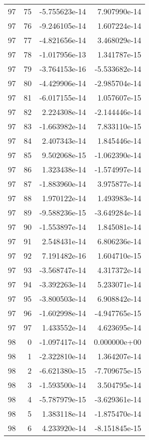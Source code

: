 \begin{tabular}{rrrr}
  97 &   75 & -5.755623e-14 &  7.907990e-14 \\
  97 &   76 & -9.246105e-14 &  1.607224e-14 \\
  97 &   77 & -4.821656e-14 &  3.468029e-14 \\
  97 &   78 & -1.017956e-13 &  1.341787e-15 \\
  97 &   79 & -3.764153e-16 & -5.533682e-14 \\
  97 &   80 & -4.429906e-14 & -2.985704e-14 \\
  97 &   81 & -6.017155e-14 &  1.057607e-15 \\
  97 &   82 &  2.224308e-14 & -2.144446e-14 \\
  97 &   83 & -1.663982e-14 &  7.833110e-15 \\
  97 &   84 &  2.407343e-14 &  1.845446e-14 \\
  97 &   85 &  9.502068e-15 & -1.062390e-14 \\
  97 &   86 &  1.323438e-14 & -1.574997e-14 \\
  97 &   87 & -1.883960e-14 &  3.975877e-14 \\
  97 &   88 &  1.970122e-14 &  1.493983e-14 \\
  97 &   89 & -9.588236e-15 & -3.649284e-14 \\
  97 &   90 & -1.553897e-14 &  1.845081e-14 \\
  97 &   91 &  2.548431e-14 &  6.806236e-14 \\
  97 &   92 &  7.191482e-16 &  1.604710e-15 \\
  97 &   93 & -3.568747e-14 &  4.317372e-14 \\
  97 &   94 & -3.392263e-14 &  5.233071e-14 \\
  97 &   95 & -3.800503e-14 &  6.908842e-14 \\
  97 &   96 & -1.602998e-14 & -4.947765e-15 \\
  97 &   97 &  1.433552e-14 &  4.623695e-14 \\
  98 &    0 & -1.097417e-14 &  0.000000e+00 \\
  98 &    1 & -2.322810e-14 &  1.364207e-14 \\
  98 &    2 & -6.621380e-15 & -7.709675e-15 \\
  98 &    3 & -1.593500e-14 &  3.504795e-14 \\
  98 &    4 & -5.787979e-15 & -3.629361e-14 \\
  98 &    5 &  1.383118e-14 & -1.875470e-14 \\
  98 &    6 &  4.233920e-14 & -8.151845e-15 \\

\end{tabular}
